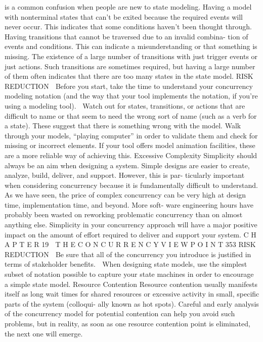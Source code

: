 is a common confusion when people are new to state modeling.
Having a model with nonterminal states that can’t be exited because the
required events will never occur. This indicates that some conditions
haven’t been thought through.
Having transitions that cannot be traversed due to an invalid combina-
tion of events and conditions. This can indicate a misunderstanding or
that something is missing.
The existence of a large number of transitions with just trigger events or
just actions. Such transitions are sometimes required, but having a large
number of them often indicates that there are too many states in the
state model.
RISK REDUCTION
 Before you start, take the time to understand your concurrency modeling
notation (and the way that your tool implements the notation, if you’re
using a modeling tool).
Watch out for states, transitions, or actions that are difficult to name or
that seem to need the wrong sort of name (such as a verb for a state).
These suggest that there is something wrong with the model.
Walk through your models, “playing computer” in order to validate them
and check for missing or incorrect elements. If your tool offers model
animation facilities, these are a more reliable way of achieving this.
Excessive Complexity
Simplicity should always be an aim when designing a system. Simple designs
are easier to create, analyze, build, deliver, and support. However, this is par-
ticularly important when considering concurrency because it is fundamentally
difficult to understand. As we have seen, the price of complex concurrency
can be very high at design time, implementation time, and beyond. More soft-
ware engineering hours have probably been wasted on reworking problematic
concurrency than on almost anything else. Simplicity in your concurrency
approach will have a major positive impact on the amount of effort required to
deliver and support your system.
C H A P T E R 19  T H E C O N C U R R E N C Y V I E W P O I N T
 353
RISK REDUCTION
 Be sure that all of the concurrency you introduce is justified in terms of
stakeholder benefits.
 When designing state models, use the simplest subset of notation possible
to capture your state machines in order to encourage a simple state model.
Resource Contention
Resource contention usually manifests itself as long wait times for shared
resources or excessive activity in small, specific parts of the system (colloqui-
ally known as hot spots). Careful and early analysis of the concurrency model
for potential contention can help you avoid such problems, but in reality, as
soon as one resource contention point is eliminated, the next one will emerge.
